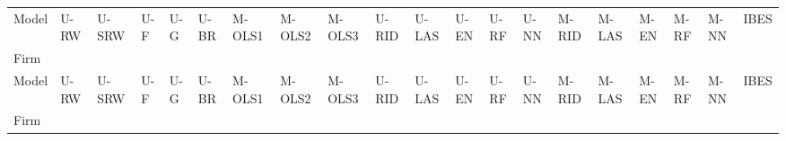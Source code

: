 \documentclass[a4paper，11pt]{jsarticle}
\begin{document}
%
\tiny
\begin{longtable}[c]{lp{3mm}p{3mm}p{3mm}p{3mm}p{3mm}p{3mm}p{3mm}p{3mm}p{3mm}p{3mm}p{3mm}p{3mm}p{3mm}p{3mm}p{3mm}p{3mm}p{3mm}p{3mm}p{3mm}}
\\
\toprule
Model &   U-RW &  U-SRW & U-F & U-G & U-BR &  M-OLS1 &  M-OLS2 &   M-OLS3 & U-RID & U-LAS &   U-EN &   U-RF &    U-NN & M-RID & M-LAS &   M-EN &   M-RF &    M-NN &   IBES \\
Firm            &        &        &           &           &            &         &         &          &         &         &        &        &         &         &         &        &        &         &        \\
\midrule
\endfirsthead
\toprule
Model &   U-RW &  U-SRW & U-F & U-G & U-BR &  M-OLS1 &  M-OLS2 &   M-OLS3 & U-RID & U-LAS &   U-EN &   U-RF &    U-NN & M-RID & M-LAS &   M-EN &   M-RF &    M-NN &   IBES \\
Firm            &        &        &           &           &            &         &         &          &         &         &        &        &         &         &         &        &        &         &        \\
\midrule
\endhead

\end{longtable}
\end{document}
